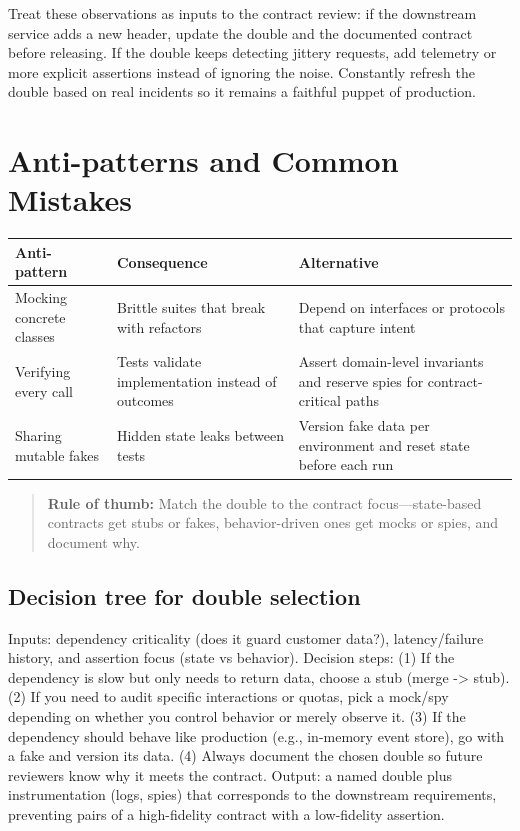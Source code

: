 Treat these observations as inputs to the contract review: if the downstream service adds a new header, update the double and the documented contract before releasing. If the double keeps detecting jittery requests, add telemetry or more explicit assertions instead of ignoring the noise. Constantly refresh the double based on real incidents so it remains a faithful puppet of production.

\section{Anti-patterns and Common Mistakes}
\begin{tabular}{p{4cm}p{4cm}p{4cm}}
\toprule
Anti-pattern & Consequence & Alternative \\
\midrule
Mocking concrete classes & Brittle suites that break with refactors & Depend on interfaces or protocols that capture intent \\
Verifying every call & Tests validate implementation instead of outcomes & Assert domain-level invariants and reserve spies for contract-critical paths \\
Sharing mutable fakes & Hidden state leaks between tests & Version fake data per environment and reset state before each run \\
\bottomrule
\end{tabular}

\begin{quote}
\textbf{Rule of thumb:} Match the double to the contract focus—state-based contracts get stubs or fakes, behavior-driven ones get mocks or spies, and document why.
\end{quote}

\subsection{Decision tree for double selection}
Inputs: dependency criticality (does it guard customer data?), latency/failure history, and assertion focus (state vs behavior). Decision steps: (1) If the dependency is slow but only needs to return data, choose a stub (merge -> stub). (2) If you need to audit specific interactions or quotas, pick a mock/spy depending on whether you control behavior or merely observe it. (3) If the dependency should behave like production (e.g., in-memory event store), go with a fake and version its data. (4) Always document the chosen double so future reviewers know why it meets the contract. Output: a named double plus instrumentation (logs, spies) that corresponds to the downstream requirements, preventing pairs of a high-fidelity contract with a low-fidelity assertion.

